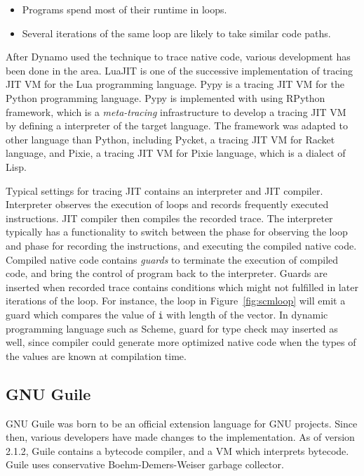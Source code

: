 \documentclass[preprint, numbers]{sigplanconf}
\begin{document}
\begin{itemize}
\item Programs spend most of their runtime in loops.
\item Several iterations of the same loop are likely to take similar code
  paths.
\end{itemize}

After Dynamo\cite{bala2000dynamo} used the technique to trace native code,
various development has been done in the area. LuaJIT\cite{pall2008luajit} is
one of the successive implementation of tracing JIT VM for the Lua programming
language. Pypy\cite{bolz2009tracing} is a tracing JIT VM for the Python
programming language. Pypy is implemented with using
RPython\cite{bolz2009tracing} framework, which is a \textit{meta-tracing}
infrastructure to develop a tracing JIT VM by defining a interpreter of the
target language. The framework was adapted to other language than Python,
including Pycket\citep{bauman2015pycket}, a tracing JIT VM for Racket
language, and Pixie\citep{baldridge2014pixie}, a tracing JIT VM for Pixie
language, which is a dialect of Lisp.

Typical settings for tracing JIT contains an interpreter and JIT
compiler. Interpreter observes the execution of loops and records frequently
executed instructions. JIT compiler then compiles the recorded trace. The
interpreter typically has a functionality to switch between the phase for
observing the loop and phase for recording the instructions, and executing the
compiled native code.  Compiled native code contains \textit{guards} to
terminate the execution of compiled code, and bring the control of program
back to the interpreter. Guards are inserted when recorded trace contains
conditions which might not fulfilled in later iterations of the loop. For
instance, the loop in Figure~\hyperref[fig:scmloop]{\ref{fig:scmloop}} will
emit a guard which compares the value of \texttt{i} with length of the
vector. In dynamic programming language such as Scheme, guard for type check
may inserted as well, since compiler could generate more optimized native code
when the types of the values are known at compilation time.

\subsection{GNU Guile}

GNU Guile was born to be an official extension language for GNU
projects\cite{guileref}. Since then, various developers have made changes to
the implementation. As of version 2.1.2, Guile contains a bytecode compiler,
and a VM which interprets bytecode. Guile uses conservative
Boehm-Demers-Weiser garbage collector\cite{boehm1988garbage}.
\end{document}
